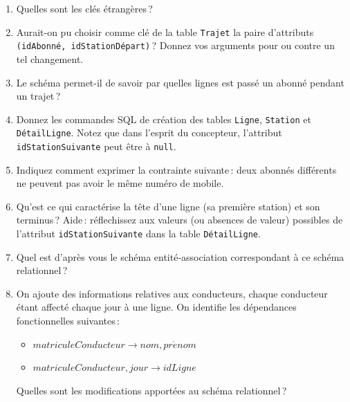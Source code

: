 \begin{enumerate}
   \item Quelles sont les clés étrangères\,?

 \item Aurait-on pu choisir comme clé de la table \texttt{Trajet}
      la paire d'attributs \texttt{(idAbonné, idStationDépart)}\,? Donnez vos arguments pour ou contre
      un tel changement.
       
  \item Le schéma permet-il de savoir par quelles lignes est passé un abonné pendant un trajet\,?
  
 \item Donnez les commandes SQL de création des tables \texttt{Ligne}, \texttt{Station}
 et \texttt{DétailLigne}. Notez que dans l'esprit du concepteur, l'attribut \texttt{idStationSuivante}
  peut être à  \texttt{null}.
  
  \item Indiquez comment exprimer la contrainte suivante\,:
         deux abonnés différents ne peuvent pas avoir le même
             numéro de mobile.
             
  \item Qu'est ce qui caractérise la tête d'une ligne (sa première station) et son terminus\,? 
      Aide\,: réflechissez aux valeurs (ou absences de valeur) possibles de l'attribut \texttt{idStationSuivante}
      dans la table \texttt{DétailLigne}.
 
  \item Quel est d'après vous le schéma entité-association 
        correspondant à ce schéma relationnel\,?
        
   \item On ajoute des informations relatives aux conducteurs, chaque conducteur étant 
      affecté chaque jour à une ligne. On identifie les dépendances fonctionnelles suivantes\,:
      \begin{itemize}
        \item $matriculeConducteur \to nom, pr\acute{e}nom$
        \item $matriculeConducteur, jour \to idLigne$
      \end{itemize}
      Quelles sont les modifications apportées au schéma relationnel\,?

\end{enumerate}

